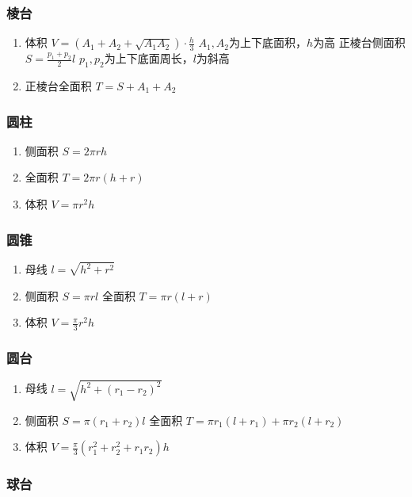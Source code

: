 \documentclass[landscape,twocolumn,a4paper]{article}
\begin{document}
	\subsubsection*{棱台}

	\begin{enumerate}
		\item 体积
		$V=(A_1+A_2+\sqrt{A_1A_2}) \cdot \frac{h}{3}$
		$A_1,A_2$为上下底面积，$h$为高    正棱台侧面积
		$S=\frac{p_1+p_2}{2}l$
		$p_1,p_2$为上下底面周长，$l$为斜高
		\item 正棱台全面积
		$T=S+A_1+A_2$
	\end{enumerate}

	\subsubsection*{圆柱}

	\begin{enumerate}
		\item 侧面积
		$S=2\pi rh$
		\item 全面积
		$T=2\pi r(h+r)$
		\item 体积
		$V=\pi r^2h$
	\end{enumerate}

	\subsubsection*{圆锥}

	\begin{enumerate}
		\item 母线
		$l=\sqrt{h^2+r^2}$
		\item 侧面积
		$S=\pi rl$    全面积
		$T=\pi r(l+r)$
		\item 体积
		$V=\frac{\pi}{3} r^2h$
	\end{enumerate}

	\subsubsection*{圆台}

	\begin{enumerate}
		\item 母线
		$l=\sqrt{h^2+(r_1-r_2)^2}$
		\item 侧面积
		$S=\pi(r_1+r_2)l$    全面积
		$T=\pi r_1(l+r_1)+\pi r_2(l+r_2)$
		\item 体积
		$V=\frac{\pi}{3}(r_1^2+r_2^2+r_1r_2)h$
	\end{enumerate}

	\subsubsection*{球台}
\end{document}
